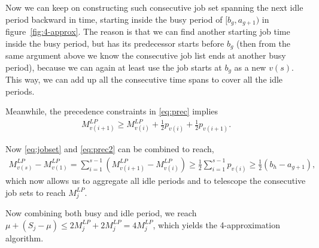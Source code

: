 Now we can keep on constructing such consecutive job set spanning the next idle period backward in time, starting inside the busy period of $[b_g, a_{g+1})$ in figure~\ref{fig:4-approx}. The reason is that we can find another starting job time inside the busy period, but has its predecessor starts before $b_g$ (then from the same argument above we know the consecutive job list ends at another busy period), because we can again at least use the job starts at $b_g$ as a new $v(s)$. This way, we can add up all the consecutive time spans to cover all the idle periods. 

Meanwhile, the precedence constraints in \eqref{eq:prec} implies
\begin{align}
M^{LP}_{v(i+1)} \geq M^{LP}_{v(i)} + \frac{1}{2}p_{v(i)} + \frac{1}{2}p_{v(i+1)}. \label{eq:prec2}
\end{align}

Now \eqref{eq:jobset} and \eqref{eq:prec2} can be combined to reach,
\begin{align}
M^{LP}_{v(s)} - M^{LP}_{v(1)} = \sum_{i=1}^{s-1} \left(M^{LP}_{v(i+1)} - M^{LP}_{v(i)}\right) \geq \frac{1}{2}\sum_{i=1}^{s-1} p_{v(i)} \geq \frac{1}{2} (b_h-a_{g+1}),
\end{align}
which now allows us to aggregate all idle periods and to telescope the consecutive job sets to reach $M_j^{LP}$. 

Now combining both busy and idle period, we reach $\mu + (S_j - \mu) \leq 2M_j^{LP} + 2M_j^{LP} = 4M_j^{LP}$, which yields the 4-approximation algorithm.
